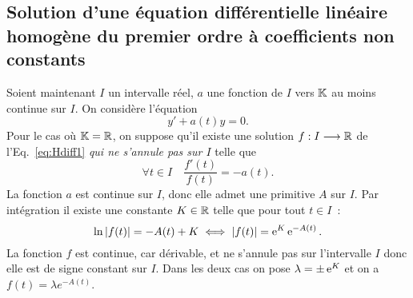 \subsection[Solution équation homogène coefficients non constants]{Solution d'une équation différentielle linéaire homogène du premier ordre à coefficients non constants}
Soient maintenant $I$ un intervalle réel, $a$ une fonction de $I$ vers $\mathbb{K}$ au moins continue sur $I$. On considère l'équation
\begin{equation}
y'+a(t)y=0 \label{eq:Hdiff1}.
\end{equation}
Pour le cas où $\mathbb{K}=\mathbb{R}$, on suppose qu'il existe une solution $f:I \longrightarrow \mathbb{R}$ de l'Eq.~\eqref{eq:Hdiff1} \emph{qui ne s'annule pas sur $I$} telle que
\begin{equation}
\forall t \in I \quad \frac{f'(t)}{f(t)}=-a(t).
\end{equation}
La fonction $a$ est continue sur $I$, donc elle admet une primitive $A$ sur $I$. Par intégration il existe une constante $K \in \mathbb{R}$ telle que pour tout $t \in I$~:
\begin{equation}
\ln\left\lvert f(t)\right\rvert=-A(t) +K \iff \left\lvert f(t)\right\rvert=\operatorname{e}^K \operatorname{e}^{-A(t)}.
\end{equation}
La fonction $f$ est continue, car dérivable, et ne s'annule pas sur l'intervalle $I$ donc elle est de signe constant sur $I$. Dans les deux cas on pose $\lambda=\pm \operatorname{e}^K$ et on a $f(t)=\lambda e^{-A(t)}$. 

